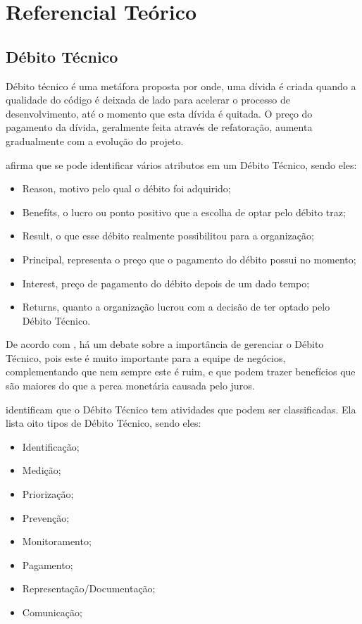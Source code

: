 \chapter[Referencial Teórico]{Referencial Teórico}

\section{Débito Técnico}
Débito técnico é uma metáfora proposta por \cite{cunningham} onde, uma dívida é
criada quando a qualidade do código é deixada de lado para acelerar o processo
de desenvolvimento, até o momento que esta dívida é quitada. O preço do pagamento
da dívida, geralmente feita através de refatoração,  aumenta gradualmente com
a evolução do projeto.

\cite{oliveira} afirma que se pode identificar vários atributos em um Débito
Técnico, sendo eles:

\begin{itemize}
  \item Reason, motivo pelo qual o débito foi adquirido;
  \item Benefíts, o lucro ou ponto positivo que a escolha de optar pelo débito traz;
  \item Result, o que esse débito realmente possibilitou para a organização;
  \item Principal, representa o preço que o pagamento do débito possui no momento;
  \item Interest, preço de pagamento do débito depois de um dado tempo;
  \item Returns, quanto a organização lucrou com a decisão de ter optado pelo Débito Técnico.
\end{itemize}


De acordo com \cite{mapping}, há um debate sobre a importância de gerenciar o
Débito Técnico, pois este é muito importante para a equipe de negócios,
complementando que nem sempre este é ruim, e que podem trazer benefícios
que são maiores do que a perca monetária causada pelo juros.

\cite{mapping} identificam que o Débito Técnico tem atividades que podem ser classificadas.
Ela lista oito tipos de Débito Técnico, sendo eles:

\begin{itemize}
  \item Identificação;
  \item Medição;
  \item Priorização;
  \item Prevenção;
  \item Monitoramento;
  \item Pagamento;
  \item Representação/Documentação;
  \item Comunicação;
\end{itemize}

